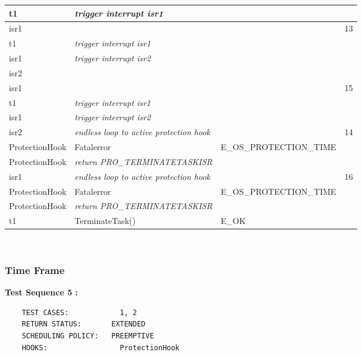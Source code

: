 \documentclass[10pt]{article}
\newlength{\Li}\settowidth{\Li}{Running}
\newlength{\Lii}\setlength{\Lii}{7cm}
\newlength{\Liiii}\setlength{\Liiii}{0.9cm}
\newlength{\Liii}\setlength{\Liii}{\textwidth} \addtolength{\Liii}{-\Li} \addtolength{\Liii}{-\Lii} \addtolength{\Liii}{-\Liiii}
\begin{document}
	\begin{supertabular}{|p{\Li}|p{\Lii}|p{\Liii}|p{\Liiii}|} \hline 
	t1	& \textit{trigger interrupt isr1}					& 												& \\ \hline
	isr1	& 										& 												& 13 \\ \hline
	t1	& \textit{trigger interrupt isr1}					& 												& \\ \hline
	isr1	& \textit{trigger interrupt isr2}					& 												& \\ \hline
	isr2	& 										& 												& \\ \hline
	isr1	& 										& 												& 15 \\ \hline
	t1	& \textit{trigger interrupt isr1}					& 												& \\ \hline
	isr1	& \textit{trigger interrupt isr2}					& 												& \\ \hline
	isr2	& \textit{endless loop to active protection hook}		&												& 14 \\ \hline
	ProtectionHook		& Fatalerror					& E\_OS\_PROTECTION\_TIME 						& \\ \hline
	ProtectionHook		& \textit{return PRO\_TERMINATETASKISR}	& 										& \\ \hline
	isr1	& \textit{endless loop to active protection hook}		& 												& 16 \\ \hline
	ProtectionHook		& Fatalerror					& E\_OS\_PROTECTION\_TIME 						& \\ \hline
	ProtectionHook		& \textit{return PRO\_TERMINATETASKISR}	& 										& \\ \hline
	t1	& TerminateTask()							& E\_OK											& \\ \hline
	\end{supertabular}\\
	
\subsubsection{Time Frame}

	\textbf{Test Sequence 5 :}
	\begin{lstlisting}
	TEST CASES:		       1, 2
	RETURN STATUS:	  	 EXTENDED
	SCHEDULING POLICY:   PREEMPTIVE
	HOOKS:		           ProtectionHook
	\end{lstlisting}
	
\end{document}
